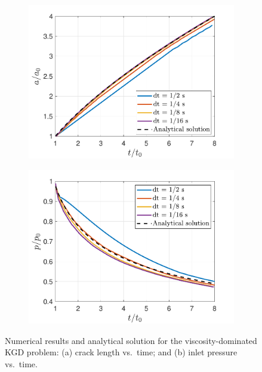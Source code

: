 \begin{figure}[!htbp]
\centering
\begin{subfigure}{.5\textwidth}
  \centering
  \includegraphics[width=.99\linewidth]{img/viscosity_prob/vkgd_noaeff_length_paper}
  \caption{}
  \label{fig:vkgd_length}
\end{subfigure}%
\begin{subfigure}{.5\textwidth}
  \centering
  \includegraphics[width=.99\linewidth]{img/viscosity_prob/vkgd_noaeff_paper}
  \caption{}
  \label{fig:vkgd_pressure}
\end{subfigure}
\caption{Numerical results and analytical solution for the viscosity-dominated KGD problem: (a) crack length vs.\ time; and (b) inlet pressure vs.\ time. 
}
  \label{fig:vkgd_charts}
\end{figure}

